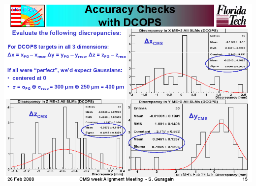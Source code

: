 \documentclass[compress]{beamer}
\begin{document}
\begin{frame}
\mbox{\hspace{-1 cm}\includegraphics[width=1.2\linewidth]{samirs_plots.png}}
\end{frame}
\end{document}
